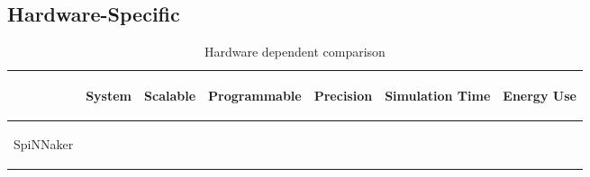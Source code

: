 \subsection{Hardware-Specific}
\label{subsec:hw}
\begin{table*}[thb!]
  \caption{Hardware dependent comparison}
  \begin{center}
      \bgroup
      \def\arraystretch{1.4}
    \begin{tabular}{l c c c c c c}
      $ $ & 
       \begin{mycell}{2.0cm} System \end{mycell} & 
       \begin{mycell}{2.0cm} Scalable \end{mycell} & 
       \begin{mycell}{2.0cm} Programmable \end{mycell} & 
       \begin{mycell}{2.0cm} Precision \end{mycell} &  
       \begin{mycell}{2.0cm} Simulation Time \end{mycell} & 
       \begin{mycell}{2.0cm} Energy Use \end{mycell} 
	   \\
       \hline
       \begin{mycell}{1.8cm} SpiNNaker \citep{strometal} \end{mycell} &

\end{tabular}
\end{center}
\end{table*}
